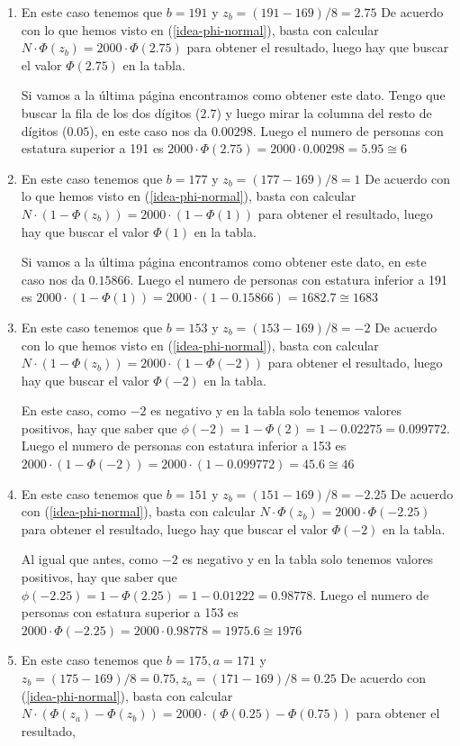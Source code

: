 \begin{enumerate}
\def\labelenumi{\arabic{enumi}.}
\item
  En este caso tenemos que \(b = 191\) y \(z_b = (191-169)/8=2.75\) De
  acuerdo con lo que hemos visto en
  (\protect\hyperlink{idea-phi-normal}{{[}idea-phi-normal{]}}), basta
  con calcular \(N\cdot \Phi(z_b)= 2000\cdot \Phi(2.75)\) para obtener
  el resultado, luego hay que buscar el valor \(\Phi(2.75)\) en la
  tabla.

  Si vamos a la última página encontramos como obtener este dato. Tengo
  que buscar la fila de los dos dígitos (\(2.7\)) y luego mirar la
  columna del resto de dígitos (\(0.05\)), en este caso nos da
  \(0.00298\). Luego el numero de personas con estatura superior a 191
  es \(2000\cdot \Phi(2.75)= 2000 \cdot 0.00298= 5.95 \cong 6\)
\item
  En este caso tenemos que \(b = 177\) y \(z_b = (177-169)/8=1\) De
  acuerdo con lo que hemos visto en
  (\protect\hyperlink{idea-phi-normal}{{[}idea-phi-normal{]}}), basta
  con calcular \(N\cdot (1 - \Phi(z_b))= 2000\cdot (1-\Phi(1))\) para
  obtener el resultado, luego hay que buscar el valor \(\Phi(1)\) en la
  tabla.

  Si vamos a la última página encontramos como obtener este dato, en
  este caso nos da \(0.15866\). Luego el numero de personas con estatura
  inferior a 191 es
  \(2000\cdot (1-\Phi(1))= 2000 \cdot (1-0.15866)= 1682.7 \cong 1683\)
\item
  En este caso tenemos que \(b = 153\) y \(z_b = (153-169)/8=-2\) De
  acuerdo con lo que hemos visto en
  (\protect\hyperlink{idea-phi-normal}{{[}idea-phi-normal{]}}), basta
  con calcular \(N\cdot (1 - \Phi(z_b))= 2000\cdot (1-\Phi(-2))\) para
  obtener el resultado, luego hay que buscar el valor \(\Phi(-2)\) en la
  tabla.

  En este caso, como \(-2\) es negativo y en la tabla solo tenemos
  valores positivos, hay que saber que
  \(\phi(-2) = 1 - \Phi(2) = 1- 0.02275 = 0.099772\). Luego el numero de
  personas con estatura inferior a 153 es
  \(2000\cdot (1-\Phi(-2))= 2000 \cdot (1-0.099772)= 45.6 \cong 46\)
\item
  En este caso tenemos que \(b = 151\) y \(z_b = (151-169)/8=-2.25\) De
  acuerdo con
  (\protect\hyperlink{idea-phi-normal}{{[}idea-phi-normal{]}}), basta
  con calcular \(N\cdot \Phi(z_b)= 2000\cdot \Phi(-2.25)\) para obtener
  el resultado, luego hay que buscar el valor \(\Phi(-2)\) en la tabla.

  Al igual que antes, como \(-2\) es negativo y en la tabla solo tenemos
  valores positivos, hay que saber que
  \(\phi(-2.25) = 1 - \Phi(2.25) = 1- 0.01222 = 0.98778\). Luego el
  numero de personas con estatura superior a 153 es
  \(2000\cdot \Phi(-2.25)= 2000 \cdot 0.98778= 1975.6 \cong 1976\)
\item
  En este caso tenemos que \(b = 175, a =171\) y
  \(z_b = (175-169)/8=0.75, z_a = (171-169)/8=0.25\) De acuerdo con
  (\protect\hyperlink{idea-phi-normal}{{[}idea-phi-normal{]}}), basta
  con calcular
  \(N\cdot (\Phi(z_a) - \Phi(z_b))= 2000\cdot (\Phi(0.25) - \Phi(0.75))\)
  para obtener el resultado,


\end{enumerate}
